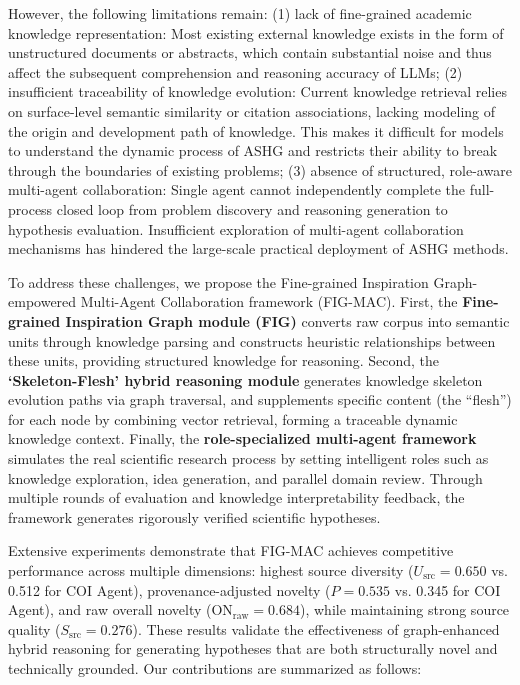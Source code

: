 \documentclass[runningheads]{llncs}
\begin{document}
However, the following limitations remain: (1) lack of fine-grained academic knowledge representation: Most existing external knowledge exists in the form of unstructured documents or abstracts, which contain substantial noise and thus affect the subsequent comprehension and reasoning accuracy of LLMs; (2) insufficient traceability of knowledge evolution: Current knowledge retrieval relies on surface-level semantic similarity or citation associations, lacking modeling of the origin and development path of knowledge. This makes it difficult for models to understand the dynamic process of ASHG and restricts their ability to break through the boundaries of existing problems; (3) absence of structured, role-aware multi-agent collaboration: Single agent cannot independently complete the full-process closed loop from problem discovery and reasoning generation to hypothesis evaluation. Insufficient exploration of multi-agent collaboration mechanisms has hindered the large-scale practical deployment of ASHG methods.

To address these challenges, we propose the Fine-grained Inspiration Graph-empowered Multi-Agent Collaboration framework (FIG-MAC). First, the \textbf{Fine-grained Inspiration Graph module (FIG)} converts raw corpus into semantic units through knowledge parsing and constructs heuristic relationships between these units, providing structured knowledge for reasoning. Second, the \textbf{`Skeleton-Flesh' hybrid reasoning module} generates knowledge skeleton evolution paths via graph traversal, and supplements specific content (the ``flesh'') for each node by combining vector retrieval, forming a traceable dynamic knowledge context. Finally, the \textbf{role-specialized multi-agent framework} simulates the real scientific research process by setting intelligent roles such as knowledge exploration, idea generation, and parallel domain review. Through multiple rounds of evaluation and knowledge interpretability feedback, the framework generates rigorously verified scientific hypotheses.

Extensive experiments demonstrate that FIG-MAC achieves competitive performance across multiple dimensions: highest source diversity ($U_{\text{src}}=0.650$ vs. 0.512 for COI Agent), provenance-adjusted novelty ($P=0.535$ vs. 0.345 for COI Agent), and raw overall novelty (ON$_{\text{raw}}=0.684$), while maintaining strong source quality ($S_{\text{src}}=0.276$). These results validate the effectiveness of graph-enhanced hybrid reasoning for generating hypotheses that are both structurally novel and technically grounded. Our contributions are summarized as follows:
\end{document}
